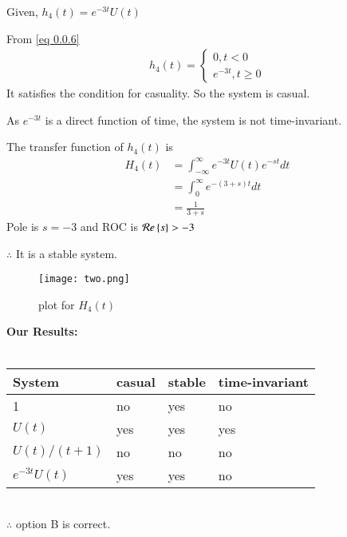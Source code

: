 \documentclass[journal,12pt,twocolumn]{IEEEtran}
\begin{document}
Given, $h_4(t) = e^{-3t}U(t)$

From \eqref{eq 0.0.6}
\begin{align}
    h_4(t) = 
    \begin{cases}
    0, t<0\\
    e^{-3t}, t\geq 0
    \end{cases}
\end{align}
It satisfies the condition for casuality. So the system is casual.

As $e^{-3t}$ is a direct function of time, the system is not time-invariant.

The transfer function of $h_4(t)$ is 
\begin{align}
    H_4(t) &= \int_{-\infty}^{\infty} e^{-3t}U(t)e^{-st} dt\\
    &= \int_{0}^{\infty} e^{-(3+s)t} dt\\
    &= \frac{1}{3+s}
\end{align}
Pole is $s = -3$ and ROC is $\mathcal{R}e\left\{s\right\} > -3$

$\therefore$ It is a stable system.

\begin{figure}[htp]
    \centering
    \texttt{[image: two.png]}
    \caption{plot for $H_4(t)$}
    \label{fig:my_label}
\end{figure}

\textbf{Our Results:}\\\\
\begin{tabular}{|p{2cm}||p{1.5cm}|p{1.5cm}|p{1.5cm}|}
     \hline
     System & casual & stable & time-invariant\\
     \hline
     1 & no & yes & no\\
     \hline
     $U(t)$ & yes & yes & yes\\
     \hline
     $U(t)/(t+1)$ & no & no & no\\
     \hline
     $e^{-3t}U(t)$ & yes & yes & no\\
     \hline
\end{tabular}\\

$\therefore$ option B is correct.
\end{document}
